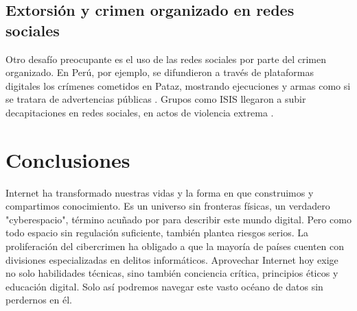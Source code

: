 \documentclass[12pt]{article}
\begin{document}
	\subsection{Extorsión y crimen organizado en redes sociales}
	Otro desafío preocupante es el uso de las redes sociales por parte del crimen organizado. En Perú, por ejemplo, se difundieron a través de plataformas digitales los crímenes cometidos en Pataz, mostrando ejecuciones y armas como si se tratara de advertencias públicas \parencite{bbc2023}. Grupos como ISIS llegaron a subir decapitaciones en redes sociales, en actos de violencia extrema \parencite{unodc2021}.
	
	\section{Conclusiones}
	
	Internet ha transformado nuestras vidas y la forma en que construimos y compartimos conocimiento. Es un universo sin fronteras físicas, un verdadero "cyberespacio", término acuñado por \parencite{gibson1984} para describir este mundo digital. Pero como todo espacio sin regulación suficiente, también plantea riesgos serios. La proliferación del cibercrimen ha obligado a que la mayoría de países cuenten con divisiones especializadas en delitos informáticos. Aprovechar Internet hoy exige no solo habilidades técnicas, sino también conciencia crítica, principios éticos y educación digital. Solo así podremos navegar este vasto océano de datos sin perdernos en él.
	
	\printbibliography
	
\end{document}
